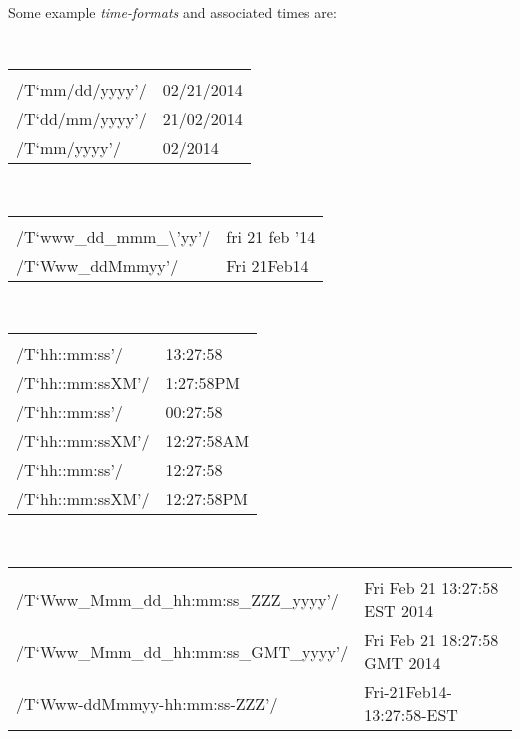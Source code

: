 \documentclass[12pt]{article}
\newcommand{\BSLASH}{\textbackslash}
\begin{document}
Some example {\em time-formats} and associated times are:
\begin{center}
\tt
\begin{tabular}{@{}l@{}l@{}}
\hspace*{3.4in} & \hspace*{3in} \\[-3ex]
/T`mm/dd/yyyy'/ & 02/21/2014 \\
/T`dd/mm/yyyy'/ & 21/02/2014 \\
/T`mm/yyyy'/ & 02/2014 \\
\end{tabular} \\
\begin{tabular}{@{}l@{}l@{}}
\hspace*{3.4in} & \hspace*{3in} \\[-3ex]
/T`www\_dd\_mmm\_\BSLASH'yy'/ & fri 21 feb '14 \\
/T`Www\_ddMmmyy'/ & Fri 21Feb14 \\
\end{tabular} \\
\begin{tabular}{@{}l@{}l@{}}
\hspace*{3.4in} & \hspace*{3in} \\[-3ex]
/T`hh::mm:ss'/ & 13:27:58 \\
/T`hh::mm:ssXM'/ & 1:27:58PM \\
/T`hh::mm:ss'/ & 00:27:58 \\
/T`hh::mm:ssXM'/ & 12:27:58AM \\
/T`hh::mm:ss'/ & 12:27:58 \\
/T`hh::mm:ssXM'/ & 12:27:58PM \\
\end{tabular} \\
\begin{tabular}{@{}l@{}l@{}}
\hspace*{3.4in} & \hspace*{3in} \\[-3ex]
/T`Www\_Mmm\_dd\_hh:mm:ss\_ZZZ\_yyyy'/ & Fri Feb 21 13:27:58 EST 2014 \\
/T`Www\_Mmm\_dd\_hh:mm:ss\_GMT\_yyyy'/ & Fri Feb 21 18:27:58 GMT 2014 \\
/T`Www-ddMmmyy-hh:mm:ss-ZZZ'/	  & Fri-21Feb14-13:27:58-EST \\
\end{tabular}
\end{center}
\end{document}
